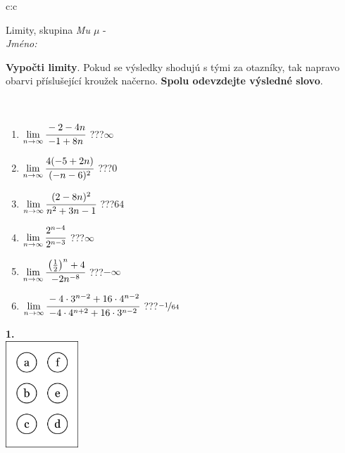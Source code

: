 \documentclass[10pt]{report}
\begin{document}
\begin{tabular}{c:c}
\begin{minipage}[c][104.5mm][t]{0.5\linewidth}
\begin{center}
\vspace{7mm}
{\huge Limity, skupina \textit{Mu $\mu$} -}\\[5mm]
\textit{Jméno:}\phantom{xxxxxxxxxxxxxxxxxxxxxxxxxxxxxxxxxxxxxxxxxxxxxxxxxxxxxxxxxxxxxxxxx}\\[5mm]
\begin{minipage}{0.95\linewidth}
\begin{center}
\textbf{Vypočti limity}. Pokud se výsledky shodujú s tými za otazníky, tak napravo\\obarvi příslušející kroužek načerno. \textbf{Spolu odevzdejte výsledné slovo}.
\end{center}
\end{minipage}
\\[1mm]
\begin{minipage}{0.79\linewidth}
\begin{center}
\begin{varwidth}{\linewidth}
\begin{enumerate}
\normalsize
\item $\lim\limits_{n\to\infty}\cfrac{-2-4n}{-1+8n}$\quad \dotfill\; ???\;\dotfill \quad $\infty$
\item $\lim\limits_{n\to\infty}\cfrac{4(-5+2n)}{(-n-6)^2}$\quad \dotfill\; ???\;\dotfill \quad $0$
\item $\lim\limits_{n\to\infty}\cfrac{(2-8n)^2}{n^2+3n-1}$\quad \dotfill\; ???\;\dotfill \quad $64$
\item $\lim\limits_{n\to\infty}\cfrac{2^{n-4}}{2^{n-3}}$\quad \dotfill\; ???\;\dotfill \quad $\infty$
\item $\lim\limits_{n\to\infty}\cfrac{\left(\frac{1}{2}\right)^n +4}{-2n^{-8}}$\quad \dotfill\; ???\;\dotfill \quad $-\infty$
\item $\lim\limits_{n\to\infty}\cfrac{-4\cdot 3^{n-2}+16\cdot 4^{n-2}}{-4\cdot 4^{n+2}+16\cdot 3^{n-2}}$\quad \dotfill\; ???\;\dotfill \quad $\nicefrac{-1}{64}$
\end{enumerate}
\end{varwidth}
\end{center}
\end{minipage}
\begin{minipage}{0.20\linewidth}
\begin{center}
{\Huge\bfseries 1.} \\[2mm]
\includegraphics[height=40mm]{../images/braille.png}

\end{center}
\end{minipage}
\end{center}
\end{minipage}
\end{tabular}
\end{document}
